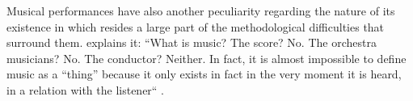 \documentclass[a4paper, 12pt, openright, oneside, german, french, brazil, english]{abntex2}
\begin{document}
	
		
	Musical performances have also another peculiarity regarding the nature of its existence in which resides a large part of the methodological difficulties that surround them.  explains it: ``What is music? The score? No. The orchestra musicians? No. The conductor? Neither. In fact, it is almost impossible to define music as a ``thing'' because it only exists in fact in the very moment it is heard, in a relation with the listener`` \cite[p. 109]{tolila2007cultura}.
	
		
	
\end{document}
